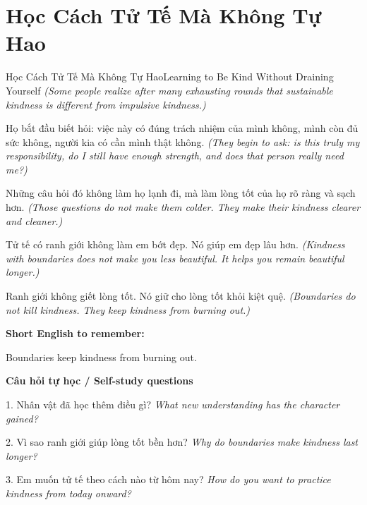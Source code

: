 \section{Học Cách Tử Tế Mà Không Tự Hao}
\begin{truyen}{Học Cách Tử Tế Mà Không Tự Hao}{Learning to Be Kind Without Draining Yourself}
\textit{(Some people realize after many exhausting rounds that sustainable kindness is different from impulsive kindness.)}

Họ bắt đầu biết hỏi: việc này có đúng trách nhiệm của mình không, mình còn đủ sức không, người kia có cần mình thật không.
\textit{(They begin to ask: is this truly my responsibility, do I still have enough strength, and does that person really need me?) }

Những câu hỏi đó không làm họ lạnh đi, mà làm lòng tốt của họ rõ ràng và sạch hơn.
\textit{(Those questions do not make them colder. They make their kindness clearer and cleaner.)}

Tử tế có ranh giới không làm em bớt đẹp. Nó giúp em đẹp lâu hơn.
\textit{(Kindness with boundaries does not make you less beautiful. It helps you remain beautiful longer.)}

\end{truyen}

\begin{baihoc}
Ranh giới không giết lòng tốt. Nó giữ cho lòng tốt khỏi kiệt quệ.
\textit{(Boundaries do not kill kindness. They keep kindness from burning out.)}
\end{baihoc}

\begin{ghinhoanh}
\textbf{Short English to remember:}

Boundaries keep kindness from burning out.

\end{ghinhoanh}

\begin{tuhocnhanh}
\textbf{Câu hỏi tự học / Self-study questions}

1. Nhân vật đã học thêm điều gì? \textit{What new understanding has the character gained?}

2. Vì sao ranh giới giúp lòng tốt bền hơn? \textit{Why do boundaries make kindness last longer?}

3. Em muốn tử tế theo cách nào từ hôm nay? \textit{How do you want to practice kindness from today onward?}
\end{tuhocnhanh}

